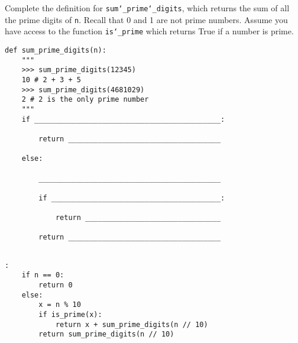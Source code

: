 \begin{blocksection}
\question Complete the definition for \texttt{sum\char`_prime\char`_digits}, which returns the sum of all the prime digits of \texttt{n}. Recall that 0 and 1 are not prime numbers. Assume you have access to the function \texttt{is\char`_prime} which returns True if a number is prime. \\

\begin{lstlisting}
def sum_prime_digits(n):
    """
    >>> sum_prime_digits(12345)
    10 # 2 + 3 + 5
    >>> sum_prime_digits(4681029)
    2 # 2 is the only prime number
    """
    if ____________________________________________:		

        return ____________________________________	

    else:

        ___________________________________________			

        if ________________________________________:		

            return ________________________________				

        return ____________________________________
				
\end{lstlisting}

\begin{solution}[1in]
\begin{lstlisting}:
    if n == 0:
        return 0
    else:
        x = n % 10
        if is_prime(x):
            return x + sum_prime_digits(n // 10)
        return sum_prime_digits(n // 10)
\end{lstlisting}
\end{solution}
\end{blocksection}

